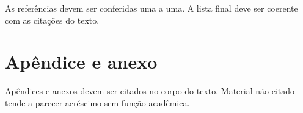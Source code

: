 As referências devem ser conferidas uma a uma. A lista final deve ser coerente com as citações do texto.

\section{Apêndice e anexo}


Apêndices e anexos devem ser citados no corpo do texto. Material não citado tende a parecer acréscimo sem função acadêmica.


